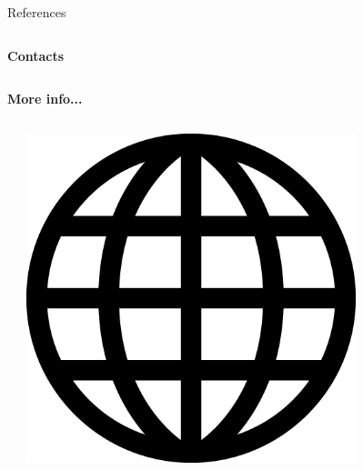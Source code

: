 \documentclass[envcountsect,usenames,dvipsnames]{beamer}
\theoremstyle{mystyle}
\renewcommand*{\bibfont}{\scriptsize}
\begin{document}
\renewcommand*{\bibfont}{\scriptsize}
\begin{frame}{References}
\begin{columns}
\column{0.85\paperwidth}
\printbibliography[section=5, heading = Ref]
\end{columns}
\end{frame}

\begin{frame}{\textbf{Contacts}}
	
	\begin{columns}
	\begin{column}{0.5\textwidth}
	
	\vspace{0.8cm}
	
	\vspace{0.7cm}
	

	\begin{block}{\textbf{More info...}}
	
	\begin{columns}
	\begin{column}{0.02\textwidth}
	
	\end{column}
	
	
		\begin{column}{0.1\textwidth}
	
		\includegraphics[width=0.75\textwidth]{Images/web} 
	
	\vspace{0.05cm}
	

\end{column}
\end{columns}
\end{block}
\end{column}
\end{columns}
\end{frame}
\end{document}
